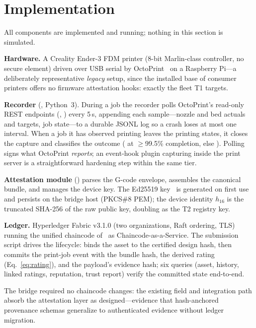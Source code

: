 \section{Implementation}
\label{sec:implementation}

All components are implemented and running; nothing in this section is
simulated.

\textbf{Hardware.}  A Creality Ender-3 FDM printer (8-bit Marlin-class
controller, no secure element) driven over USB serial by
OctoPrint~\cite{octoprint} on a Raspberry Pi---a deliberately
representative \emph{legacy} setup, since the installed base of consumer
printers offers no firmware attestation hooks: exactly the fleet T1
targets.

\textbf{Recorder} (, Python~3).  During a job the
recorder polls OctoPrint's read-only REST endpoints
(, ) every 5\,s, appending each
sample---nozzle and bed actuals and targets, job state---to a durable
JSONL log so a crash loses at most one interval.  When a job it has
observed printing leaves the printing states, it closes the capture and
classifies the outcome ( at $\geq$99.5\% completion, else
).  Polling signs what OctoPrint \emph{reports}; an
event-hook plugin capturing inside the print server is a straightforward
hardening step within the same tier.

\textbf{Attestation module} () parses the G-code
envelope, assembles the canonical bundle, and manages the device key.  The
Ed25519 key~\cite{bernstein2012high} is generated on first use and
persists on the bridge host (PKCS\#8 PEM); the device identity
$h_{16}$ is the truncated SHA-256 of the raw public key,
doubling as the T2 registry key.

\textbf{Ledger.}  Hyperledger Fabric v3.1.0 (two organizations, Raft
ordering, TLS) running the unified chaincode
of~\cite{anonymous2026unified} as Chaincode-as-a-Service.  The submission
script drives the lifecycle:
 binds the asset to the certified
design hash, then  commits the
print-job event with the bundle hash, the derived rating
(Eq.~\eqref{eq:rating}), and the payload's evidence hash; six queries
(asset, history, linked ratings, reputation, trust report) verify the
committed state end-to-end.

The bridge required no chaincode changes: the existing
 field and integration path absorb the
attestation layer as designed---evidence that hash-anchored provenance
schemas generalize to authenticated evidence without ledger migration.
